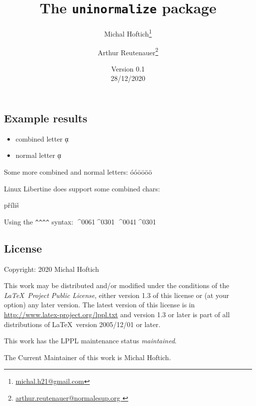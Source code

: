 \documentclass{article}
\begin{document}
\title{The \texttt{uninormalize} package}
\author{Michal Hoftich\footnote{\url{michal.h21@gmail.com}} \and Arthur Reutenauer\footnote{\url{arthur.reutenauer@normalesup.org }}}
\date{Version 0.1\\28/12/2020}
\maketitle


\subsection{Example results}

\begin{itemize}
  \item combined letter ᾳ %
  \item normal letter ᾳ%
\end{itemize}

Some more combined and normal letters: 
óóōōöö

Linux Libertine does support some combined chars: \parbox{4em}{příliš}

Using the \verb|^^^^| syntax: ^^^^0061^^^^0301 ^^^^0041^^^^0301

\subsection{License}

Copyright: 2020 Michal Hoftich

This work may be distributed and/or modified under the conditions of the 
\textit{\LaTeX\ Project Public License}, either version 1.3 of this license or (at your option)
any later version. The latest version of this license is in
\url{http://www.latex-project.org/lppl.txt} and version 1.3 or later is part of all
distributions of \LaTeX\ version 2005/12/01 or later.

This work has the LPPL maintenance status \textit{maintained}.

The Current Maintainer of this work is Michal Hoftich.
\end{document}
